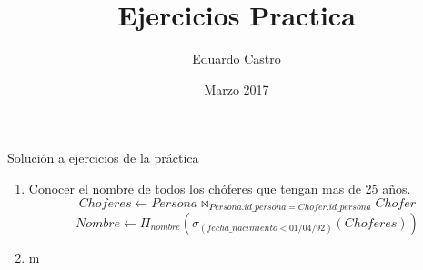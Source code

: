 \documentclass{article}
\title{Ejercicios Practica}
\author{Eduardo Castro}
\date{Marzo 2017}
\begin{document}
\maketitle
Solución a ejercicios de la práctica
\begin{enumerate}
	\item Conocer el nombre de todos los chóferes que tengan mas de 25 años.\\
	$$Choferes \leftarrow Persona \bowtie_{Persona.id\_persona = Chofer.id\_persona} Chofer$$
	$$Nombre \leftarrow \Pi_{nombre}( \sigma_{(fecha\_nacimiento < 01/04/92)}(Choferes))$$
	\item m
\end{enumerate}
\end{document}
